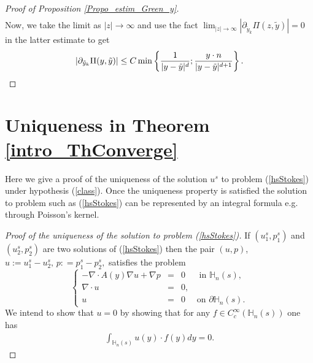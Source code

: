 \documentclass[11pt, reqno]{amsart}
\theoremstyle{definition}
\theoremstyle{remark}
\numberwithin{equation}{section}
\begin{document}
\begin{appendices}
\begin{proof}[Proof of \textup{Proposition \ref{Propo_estim_Green_y}}]
\begin{align*}
		\end{align*}
		Now, we take the limit as $|z|\rightarrow\infty$ and use the fact $\lim_{|z|\rightarrow\infty} | \partial_{\tilde{y}_k}\Pi(z,\tilde{y})|=0$  in the latter estimate to get
		\begin{align*}
			|  \partial_{\tilde{y}_k}\Pi(y,\tilde{y}) | 
			&\leq  C 	\min \left\{  \frac{1 }{ |y-\tilde{y}|^{d}  };	\frac{y\cdot n}{|y-\tilde{y}|^{d+1}  }\right\}.\qedhere\\
		\end{align*}
		
	\end{proof}
	
	

	
	\section{Uniqueness in Theorem \ref{intro_ThConverge}}\label{uniqueness}
\noindent	Here we give a proof of the uniqueness of the solution $u^s$ to problem (\ref{hsStokes}) under hypothesis (\ref{class}). Once the uniqueness property is satisfied the solution to problem such as (\ref{hsStokes}) can be represented by an integral formula e.g. through Poisson's kernel.

	\begin{proof}[Proof of the uniqueness of the solution to problem \textup{(\ref{hsStokes})}]
		If $(u^s_1, p^s_1)$ and $(u^s_2,p^s_2)$ are two solutions of (\ref{hsStokes}) then the pair $(u,p)$, $u:=u_1^s-u^s_2, \, p: =p_1^s - p_2^s,$ satisfies 
		the problem
		\begin{equation}\label{RStokes0}
			\left\{
			\begin{array}{rcl}
				-\nabla\cdot A (y) \nabla u +  \nabla p&=& 0 \;\quad \mbox{ in } \mathbb{H}_n(s)  ,\\
				\nabla\cdot u &=& 0  ,\\
				u	&=& 0  \quad \mbox{ on }  \partial\mathbb{H}_n(s).
			\end{array}
			\right. 
		\end{equation}
		We intend to show that $u=0$  by showing that for any $f\in C^\infty_c( \mathbb{H}_n(s) )$ one has 
		\begin{align}\label{targeted_result}
			\int_{  \mathbb{H}_n(s) }u(y)\cdot f(y) dy = 0.\end{align}
		

\end{proof}
\end{appendices}
\end{document}
